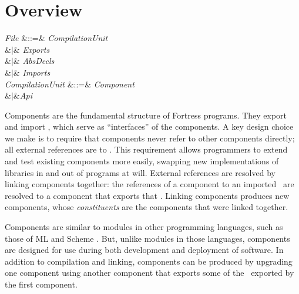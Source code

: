 %
%
%
%

\section{Overview}
\begin{Grammar}
\emph{File} &::=& \emph{CompilationUnit}\\
&$|$&  \emph{Exports} \\
&$|$&  \emph{AbsDecls}\\
&$|$& \emph{Imports} \\

\emph{CompilationUnit} &::=& \emph{Component}\\
&$|$&\emph{Api}\\
\end{Grammar}

Components are the fundamental structure of Fortress programs.
They export and import \apisN,
which serve as ``interfaces'' of the components.
A key design choice we make
is to require that components never refer
to other components directly;
all external references are to \apisN.
This requirement allows programmers
to extend and test existing components more easily,
swapping new implementations of libraries in and out of programs at will.
External references are resolved by linking components together:
the references of a component to an imported \apiN\
are resolved to a component that exports that \apiN.
Linking components produces new components,
whose \emph{constituents} are the components that were linked together.

Components are similar to modules in other programming languages,
such as those of ML and Scheme \cite{SML, OCaml, Scheme}.
But, unlike modules in those languages, components
are designed for use during both development and deployment of software.
In addition to compilation and linking,
components can be produced by upgrading one component
using another component that exports
some of the \apisN\ exported by the first component.

